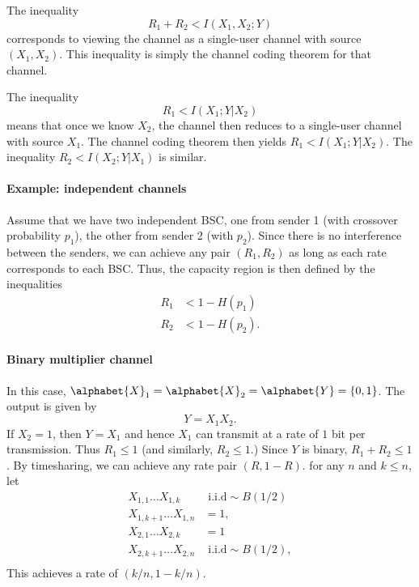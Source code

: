 \documentclass[a4paper, 11pt, openany]{book}
\begin{document}
The inequality
\[
	R_1 + R_2 < I(X_1, X_2 ; Y)
\]
corresponds to viewing the channel as a single-user channel with source $(X_1, X_2)$. This inequality is simply  the channel coding theorem for that channel.

The inequality
\[
	R_1 < I(X_1; Y | X_2)
\]
means that once we know $X_2$, the channel then reduces to a single-user channel with source $X_1$. The channel coding theorem then yields $R_1 < I(X_1; Y | X_2)$. The inequality $R_2 < I(X_2; Y | X_1)$ is similar.









\paragraph{Example: independent channels}
Assume that we have two independent BSC, one from sender 1 (with crossover probability $p_1$), the other from sender 2 (with $p_2$). Since there is no interference between the senders, we can achieve any pair $(R_1, R_2)$ as long as each rate corresponds to each BSC. Thus, the capacity region is then defined by the inequalities
\begin{align*}
	R_1 &< 1 - H(p_1)\\
	R_2 &< 1 - H(p_2).
\end{align*}











\paragraph{Binary multiplier channel}
In this case, $\alphabet{X}_1 = \alphabet{X}_2 = \alphabet{Y} = \{0,1\}$. The output is given by
\[
	Y = X_1 X_2.
\]
If $X_2 = 1$, then $Y = X_1$ and hence $X_1$ can transmit at a rate of $1$ bit per transmission. Thus $R_1 \le 1$ (and similarly, $R_2 \le 1$.) Since $Y$ is binary, $R_1 + R_2 \le 1$. By timesharing, we can achieve any rate pair $(R, 1-R)$.  for any $n$ and $k \le n$, let
\begin{align*}
	X_{1,1} \dots X_{1,k} &\text{ i.i.d} \sim B(1/2)\\
	X_{1,k+1} \dots X_{1,n} &= 1,\\
	X_{2,1} \dots X_{2,k} &= 1\\
	X_{2,k+1} \dots X_{2,n} &\text{ i.i.d} \sim B(1/2),\\
\end{align*}
This achieves a rate of $(k/n, 1-k/n)$.
\end{document}
